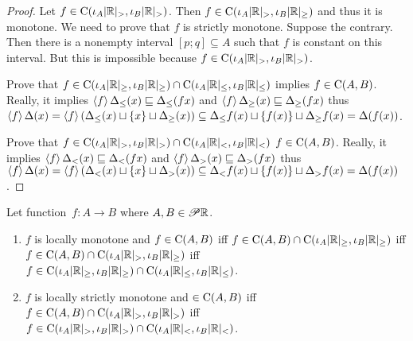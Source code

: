 \begin{proof}
Let $f\in\mathrm{C}(\iota_A|\mathbb{R}|_{>},\iota_B|\mathbb{R}|_{>})$. Then $f\in\mathrm{C}(\iota_A|\mathbb{R}|_{>},\iota_B|\mathbb{R}|_{\geq})$ and thus it is monotone.
We need to prove that $f$ is strictly monotone.
Suppose the contrary. Then there is a nonempty interval $[p;q]\subseteq A$ such that $f$ is constant on this interval.
But this is impossible because $f\in\mathrm{C}(\iota_A|\mathbb{R}|_{>},\iota_B|\mathbb{R}|_{>})$.

Prove that $f\in\mathrm{C}(\iota_A|\mathbb{R}|_{\geq},\iota_B|\mathbb{R}|_{\geq})\cap
\mathrm{C}(\iota_A|\mathbb{R}|_{\leq},\iota_B|\mathbb{R}|_{\leq})$ implies
$f\in\mathrm{C}(A,B)$. Really, it implies
$\left\langle f\right\rangle\Delta_{\leq}(x)\sqsubseteq\Delta_{\leq}(fx)$ and $\left\langle f\right\rangle\Delta_{\geq}(x)\sqsubseteq\Delta_{\geq}(fx)$
thus $\left\langle f\right\rangle\Delta(x) = \left\langle f\right\rangle(\Delta_{\leq}(x)\sqcup\{x\}\sqcup\Delta_{\geq}(x)) \subseteq
\Delta_{\leq}f(x)\sqcup\{f(x)\}\sqcup\Delta_{\geq}f(x) =
\Delta(f(x))$.

Prove that $f\in\mathrm{C}(\iota_A|\mathbb{R}|_{>},\iota_B|\mathbb{R}|_{>})\cap
\mathrm{C}(\iota_A|\mathbb{R}|_{<},\iota_B|\mathbb{R}|_{<})$
$f\in\mathrm{C}(A,B)$. Really, it implies
$\left\langle f\right\rangle\Delta_{<}(x)\sqsubseteq\Delta_{<}(fx)$ and $\left\langle f\right\rangle\Delta_{>}(x)\sqsubseteq\Delta_{>}(fx)$
thus $\left\langle f\right\rangle\Delta(x) = \left\langle f\right\rangle(\Delta_{<}(x)\sqcup\{x\}\sqcup\Delta_{>}(x)) \subseteq
\Delta_{<}f(x)\sqcup\{f(x)\}\sqcup\Delta_{>}f(x) = \Delta(f(x))$.
\end{proof}

\begin{thm}
Let function~$f:A\rightarrow B$ where $A,B\in\mathscr{P}\mathbb{R}$.
\begin{enumerate}
\item $f$ is locally monotone and $f\in\mathrm{C}(A,B)$ iff
$f\in\mathrm{C}(A,B)\cap\mathrm{C}(\iota_A|\mathbb{R}|_{\geq},\iota_B|\mathbb{R}|_{\geq})$ iff
$f\in\mathrm{C}(A,B)\cap\mathrm{C}(\iota_A|\mathbb{R}|_{>},\iota_B|\mathbb{R}|_{\geq})$ iff
$f\in\mathrm{C}(\iota_A|\mathbb{R}|_{\geq},\iota_B|\mathbb{R}|_{\geq})\cap
\mathrm{C}(\iota_A|\mathbb{R}|_{\leq},\iota_B|\mathbb{R}|_{\leq})$.
\item $f$ is locally strictly monotone and $\in\mathrm{C}(A,B)$ iff
$f\in\mathrm{C}(A,B)\cap\mathrm{C}(\iota_A|\mathbb{R}|_{>},\iota_B|\mathbb{R}|_{>})$ iff
$f\in\mathrm{C}(\iota_A|\mathbb{R}|_{>},\iota_B|\mathbb{R}|_{>})\cap
\mathrm{C}(\iota_A|\mathbb{R}|_{<},\iota_B|\mathbb{R}|_{<})$.
\end{enumerate}
\end{thm}

